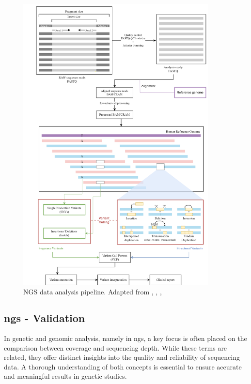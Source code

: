 \begin{figure}[H]
    \centering
    \includegraphics[width=0.9\textwidth]{figs/pipeline.png}
    \caption{NGS data analysis pipeline. Adapted from \cite{Roy2018}, \cite{pipeline}, \cite{Roy2020}, \cite{Kanzi2020}} 
    \label{fig:pipeline}
\end{figure}

\subsection{\acl{ngs} - Validation} \label{subsec:ngs_bioinformatics}

In genetic and genomic analysis, namely in \ac{ngs}, a key focus is often placed on the comparison between coverage and sequencing depth. While these terms are related, they offer distinct insights into the quality and reliability of sequencing data. A thorough understanding of both concepts is essential to ensure accurate and meaningful results in genetic studies.

